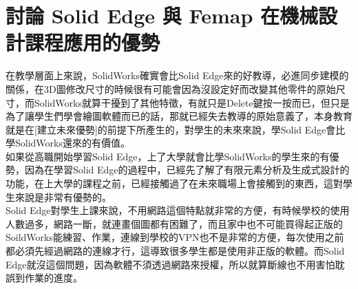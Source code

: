 \newpage

\section{討論 Solid Edge 與 Femap 在機械設計課程應用的優勢}
在教學層面上來說，SolidWorks確實會比Solid Edge來的好教導，必進同步建模的關係，在3D圖修改尺寸的時候很有可能會因為沒設定好而改變其他零件的原始尺寸，而SolidWorks就算干擾到了其他特徵，有就只是Delete鍵按一按而已，但只是為了讓學生們學會繪圖軟體而已的話，那就已經失去教導的原始意義了，本身教育就是在[建立未來優勢]的前提下所產生的，對學生的未來來說，學Solid Edge會比學SolidWorks還來的有價值。\\

如果從高職開始學習Solid Edge，上了大學就會比學SolidWorks的學生來的有優勢，因為在學習Solid Edge的過程中，已經先了解了有限元素分析及生成式設計的功能，在上大學的課程之前，已經接觸過了在未來職場上會接觸到的東西，這對學生來說是非常有優勢的。\\

Solid Edge對學生上課來說，不用網路這個特點就非常的方便，有時候學校的使用人數過多，網路一斷，就連畫個圖都有困難了，而且家中也不可能買得起正版的SoildWorks能練習、作業，連線到學校的VPN也不是非常的方便，每次使用之前都必須先經過網路的連線才行，這導致很多學生都是使用非正版的軟體。而Solid Edge就沒這個問題，因為軟體不須透過網路來授權，所以就算斷線也不用害怕耽誤到作業的進度。\\

\newpage